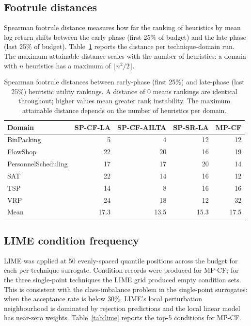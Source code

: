 \documentclass[11pt,a4paper]{article}
\begin{document}
\subsection{Footrule distances}

Spearman footrule distance measures how far the ranking of heuristics by mean log
return shifts between the early phase (first 25\% of budget) and the late phase
(last 25\% of budget). Table~\ref{tab:footrule} reports the distance per
technique-domain run. The maximum attainable distance scales with the number of
heuristics: a domain with $n$ heuristics has a maximum of $\lfloor n^2/2 \rfloor$.

\begin{table}[h]
\centering
\begin{tabular}{lrrrr}
\toprule
Domain & SP-CF-LA & SP-CF-AILTA & SP-SR-LA & MP-CF \\
\midrule
BinPacking           &  5 &  4 & 12 & 12 \\
FlowShop             & 22 & 20 & 16 & 19 \\
PersonnelScheduling  & 17 & 17 & 20 & 14 \\
SAT                  & 22 & 14 & 16 & 12 \\
TSP                  & 14 &  8 & 16 & 16 \\
VRP                  & 24 & 18 & 12 & 32 \\
\midrule
Mean                 & 17.3 & 13.5 & 15.3 & 17.5 \\
\bottomrule
\end{tabular}
\caption{Spearman footrule distances between early-phase (first 25\%) and
late-phase (last 25\%) heuristic utility rankings. A distance of 0 means
rankings are identical throughout; higher values mean greater rank instability.
The maximum attainable distance depends on the number of heuristics per domain.}
\label{tab:footrule}
\end{table}

\subsection{LIME condition frequency}

LIME was applied at 50 evenly-spaced quantile positions across the budget for each
per-technique surrogate. Condition records were produced for MP-CF; for the three
single-point techniques the LIME grid produced empty condition sets. This is
consistent with the class-imbalance problem in the single-point surrogates: when
the acceptance rate is below 30\%, LIME's local perturbation neighbourhood is
dominated by rejection predictions and the local linear model has near-zero weights.
Table~\ref{tab:lime} reports the top-5 conditions for MP-CF.
\end{document}
